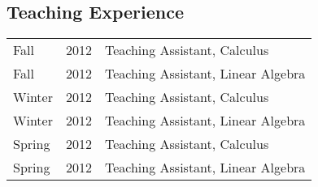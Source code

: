 \documentclass[margin,line,pifont,palatino,courier]{res}
\begin{document}
\begin{resume}
\section{\sc Teaching Experience}

\begin{tabular}{@{}p{0.4in}p{0.3in}p{4in}}
Fall   & 2012 & Teaching Assistant, Calculus\\
Fall   & 2012 & Teaching Assistant, Linear Algebra\\
Winter & 2012 & Teaching Assistant, Calculus\\
Winter & 2012 & Teaching Assistant, Linear Algebra\\
Spring & 2012 & Teaching Assistant, Calculus\\
Spring & 2012 & Teaching Assistant, Linear Algebra\\
\end{tabular}

\end{resume}
\end{document}
